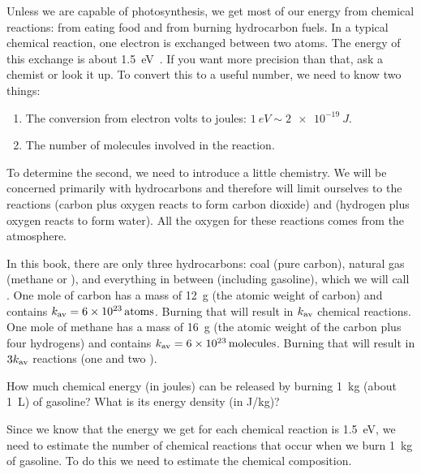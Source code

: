 Unless we are capable of photosynthesis, we get most of our energy from chemical reactions: from eating food and from burning hydrocarbon fuels. In a typical chemical reaction, one electron is exchanged between two atoms. The energy of this exchange is about \SI{1.5}{eV}~. If you want more precision than that, ask a chemist or look it up. To convert this to a useful number, we need to know two things:
%
\begin{enumerate}
%
\item The conversion from electron volts to joules: $\SI{1}{eV}\sim \SI{2e-19}{J}$.
%
\item The number of molecules involved in the reaction.
%
\end{enumerate}

To determine the second, we need to introduce a little chemistry. We will be concerned primarily with hydrocarbons and therefore will limit ourselves to the reactions  (carbon plus oxygen reacts to form carbon dioxide) and  (hydrogen plus oxygen reacts to form water). All the oxygen for these reactions comes from the atmosphere.

In this book, there are only three hydrocarbons: coal (pure carbon), natural gas (methane or ), and everything in between (including gasoline), which we will call . One mole of carbon has a mass of \SI{12}{g} (the atomic weight of carbon) and contains $k_\text{av} = \SI{6E23}{atoms}$. Burning that will result in $k_\text{av}$ chemical reactions. One mole of methane has a mass of \SI{16}{g} (the atomic weight of the carbon plus four hydrogens) and contains $k_\text{av} = \SI{6E23}{molecules}$. Burning that will result in $3k_\text{av}$ reactions (one  and two ).

How much chemical energy (in joules) can be released by burning \SI{1}{kg} (about \SI{1}{L}) of gasoline? What is its energy density (in \si{J/kg})?

Since we know that the energy we get for each chemical reaction is \SI{1.5}{eV}, we need to estimate the number of chemical reactions that occur when we burn \SI{1}{kg} of gasoline. To do this we need to estimate the chemical composition.

